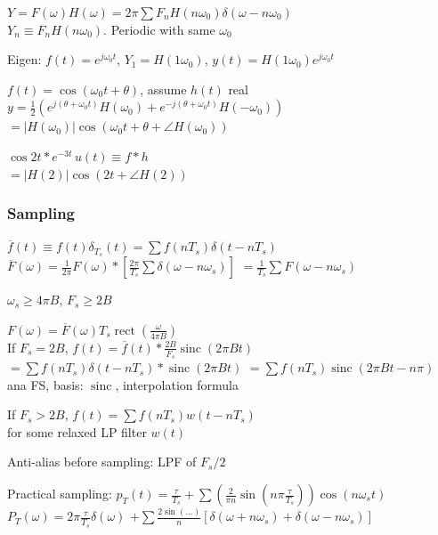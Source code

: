 \documentclass[4pt]{article}
\theoremstyle{definition}
\theoremstyle{definition}
\renewcommand{\o}{\omega}
\DeclareMathOperator{\rect}{rect}
\DeclareMathOperator{\sinc}{sinc}
\begin{document}
\begin{landscape}
\begin{multicols}{3}
    \(Y = F(\omega)H(\omega) = 2\pi \sum F_n H(n\omega_0) \delta(\omega - n\omega_0) \) \\            %
    $Y_n \equiv F_n H(n\o_0)$. Periodic with same $\omega_0$

    Eigen: $f(t) = e^{j\o_0t}$, \(Y_1 = H(1\o_0)\), $y(t) = H(1\o_0) e^{j\o_0 t}$

    $f(t) = \cos(\o_0 t + \theta)$, assume $h(t)$ real\\
    \(y = \frac 1 2 (e^{j(\theta + \o_0 t)}H(\o_0) + e^{-j(\theta + \o_0 t)}H(-\o_0))\)\\          %
    \(=|H(\o_0)| \cos(\o_0t + \theta + \angle H(\o_0))\)

    \(\cos 2t * e^{-3t}\, u(t) \equiv f * h\)\\       %
    \(=|H(2)| \cos(2t + \angle H(2))\)              %
\columnbreak
\subsubsection*{Sampling}
    \(\overline{f}(t)\equiv f(t) \delta_{T_s}(t) = \sum f(nT_s) \delta(t - nT_s)\)\\
    \(\overline{F}(\o) = \frac{1}{2\pi} F(\o) * [\frac{2\pi}{T_s} \sum\delta(\o - n\o_s)]\)
    \(= \frac{1}{T_s}\sum F(\o - n\o_s)\)

    $\o_s \geq 4\pi B$, $F_s \geq 2B$

    \(F(\o) = \overline{F}(\o) T_s \rect(\frac{\o}{4\pi B})\)\\   %
    If $F_s = 2B$, \(f(t) = \overline{f}(t) * \frac{2B}{F_s} \sinc(2\pi Bt)\)\\       %
    \(=\sum f(nT_s)\delta(t - nT_s) * \sinc(2\pi B t)\)
    \(= \sum f(nT_s) \sinc(2\pi Bt - n\pi)\)\\
    ana FS, basis: $\sinc$, interpolation formula

    If $F_s > 2B$, \(f(t) = \sum f(nT_s) w(t - nT_s)\)\\
    for some relaxed LP filter $w(t)$

    Anti-alias before sampling: LPF of $F_s/2$

    Practical sampling: \(p_T(t) = \frac{\tau}{T_s} + \sum(\frac{2}{\pi n}\sin(n\pi\frac{\tau}{T_s}))\cos(n\omega_s t)\)\\
    \(P_T(\o) = 2\pi \frac{\tau}{T_s}\delta(\o)\)
    \(+ \sum\frac{2\sin(...)}{n}[\delta(\o + n\o_s) + \delta(\o - n\o_s)]\)       %

\end{multicols}
\end{landscape}
\end{document}
